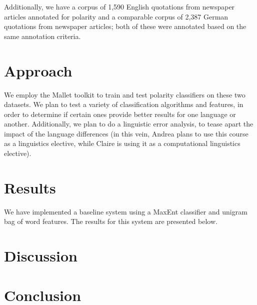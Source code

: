 \documentclass[11pt]{article}
\begin{document}
Additionally, we have a corpus of 1,590 English quotations from newspaper articles annotated for polarity and a comparable corpus of 2,387 German quotations from newspaper articles; both of these were annotated based on the same annotation criteria.

\section{Approach}

We employ the Mallet toolkit to train and test polarity classifiers on these two datasets.  We plan to test a variety of classification algorithms and features, in order to determine if certain ones provide better results for one language or another.  Additionally, we plan to do a linguistic error analysis, to tease apart the impact of the language differences (in this vein, Andrea plans to use this course as a linguistics elective, while Claire is using it as a computational linguistics elective).

\section{Results}

We have implemented a baseline system using a MaxEnt classifier and unigram bag of word features.  The results for this system are presented below.

\section{Discussion}


\section{Conclusion}

\nocite{*}




\end{document}
